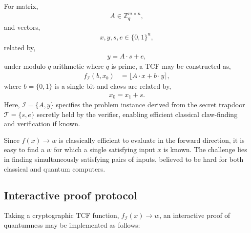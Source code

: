 For matrix,
\begin{align}
	A\in\mathbb{Z}_q^{m\times n},
\end{align}
and vectors,
\begin{align}
	x,y,s,e\in\{0,1\}^n,
\end{align}
related by,
\begin{align}
	y = A\cdot s + e,
\end{align}
under modulo $q$ arithmetic where $q$ is prime, a TCF may be constructed as,
\begin{align}
	f_\mathcal{I}(b,x_b) & = \lfloor A\cdot x + b\cdot y\rceil,
\end{align}
where $b=\{0,1\}$ is a single bit and claws are related by,
\begin{align}
	x_0=x_1+s.
\end{align}
Here, $\mathcal{I}=\{A,y\}$ specifies the problem instance derived from the secret trapdoor $\mathcal{T}=\{s,e\}$ secretly held by the verifier, enabling efficient classical claw-finding and verification if known.

Since $f(x)\to w$ is classically efficient to evaluate in the forward direction, it is easy to find a $w$ for which a single satisfying input $x$ is known. The challenge lies in finding simultaneously satisfying pairs of inputs, believed to be hard for both classical and quantum computers.

\subsection{Interactive proof protocol}

Taking a cryptographic TCF function, $f_\mathcal{I}(x)\to w$, an interactive proof of quantumness may be implemented as follows:


